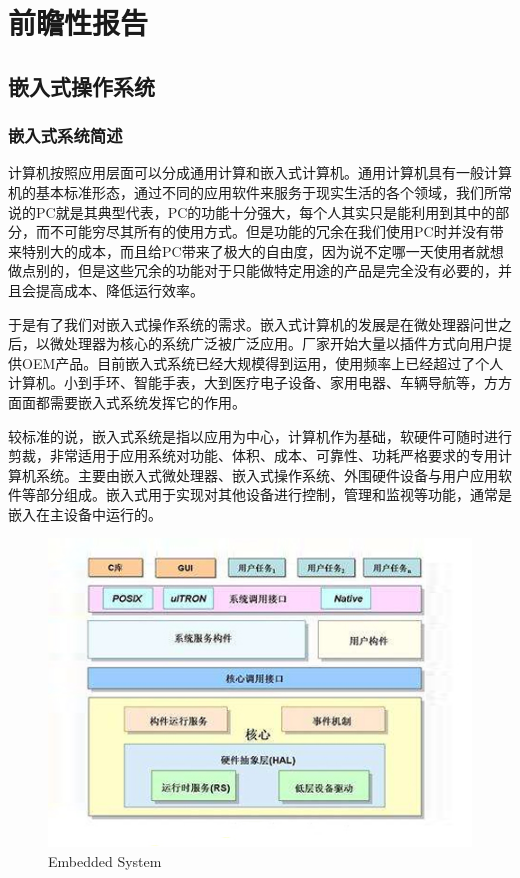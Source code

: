 \documentclass[12pt, a4paper]{article}
\begin{document}
	\section{前瞻性报告}
	\subsection{嵌入式操作系统}
	\subsubsection{嵌入式系统简述}
	计算机按照应用层面可以分成通用计算和嵌入式计算机。通用计算机具有一般计算机的基本标准形态，通过不同的应用软件来服务于现实生活的各个领域，我们所常说的PC就是其典型代表，PC的功能十分强大，每个人其实只是能利用到其中的部分，而不可能穷尽其所有的使用方式。但是功能的冗余在我们使用PC时并没有带来特别大的成本，而且给PC带来了极大的自由度，因为说不定哪一天使用者就想做点别的，但是这些冗余的功能对于只能做特定用途的产品是完全没有必要的，并且会提高成本、降低运行效率。  
	
	于是有了我们对嵌入式操作系统的需求。嵌入式计算机的发展是在微处理器问世之后，以微处理器为核心的系统广泛被广泛应用。厂家开始大量以插件方式向用户提供OEM产品。目前嵌入式系统已经大规模得到运用，使用频率上已经超过了个人计算机。小到手环、智能手表，大到医疗电子设备、家用电器、车辆导航等，方方面面都需要嵌入式系统发挥它的作用。  
	
	较标准的说，嵌入式系统是指以应用为中心，计算机作为基础，软硬件可随时进行剪裁，非常适用于应用系统对功能、体积、成本、可靠性、功耗严格要求的专用计算机系统。主要由嵌入式微处理器、嵌入式操作系统、外围硬件设备与用户应用软件等部分组成。嵌入式用于实现对其他设备进行控制，管理和监视等功能，通常是嵌入在主设备中运行的。
	
	\begin{figure}
	\centering
	\includegraphics[width=0.7\linewidth]{R1}
	\caption{Embedded System}
	\label{Embedded System}
	\end{figure}
\end{document}
